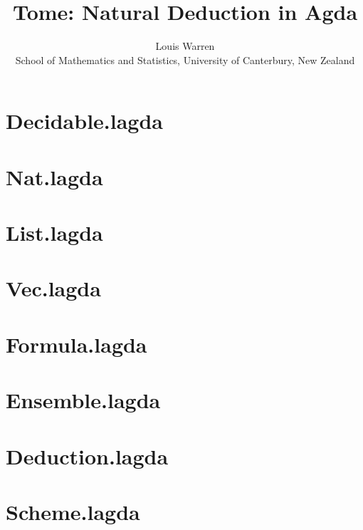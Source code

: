 \documentclass{article}
\begin{document}
\title{Tome: Natural Deduction in Agda}
\author{
Louis Warren \\
School of Mathematics and Statistics, University of Canterbury, New Zealand
}
\date{}
\maketitle

\section{Decidable.lagda}


\section{Nat.lagda}


\section{List.lagda}


\section{Vec.lagda}


\section{Formula.lagda}


\section{Ensemble.lagda}


\section{Deduction.lagda}


\section{Scheme.lagda}


{}

\end{document}
